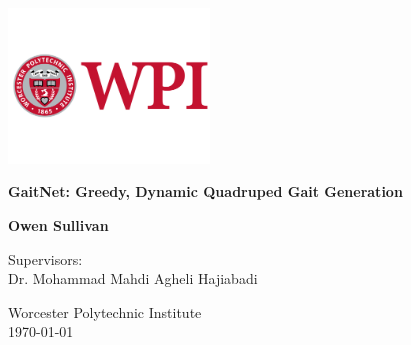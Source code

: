 \documentclass{report}
\begin{document}
\begin{titlepage}
  \centering
  \vspace*{1cm}

  \includegraphics[width=0.4\textwidth]{images/wpi-logo.png}\par\vspace{1cm} %

  \Huge
  \textbf{GaitNet: Greedy, Dynamic Quadruped Gait Generation}

  \vspace{0.5cm}
  \LARGE

  \vspace{1.5cm}

  \textbf{Owen Sullivan}

  \vfill

  \Large
  Supervisors: \\
  Dr. Mohammad Mahdi Agheli Hajiabadi

  \vspace{0.8cm}

  \Large
  Worcester Polytechnic Institute \\
  {\small \today}

\end{titlepage}

\newpage
{}
\setcounter{page}{1}

\newpage
\tableofcontents
\newpage
\listoftables
\newpage
\listoffigures

\newpage
\setcounter{page}{1}

\newpage


\newpage


\newpage


\newpage


\newpage



\renewcommand{\bibname}{References}


\end{document}
